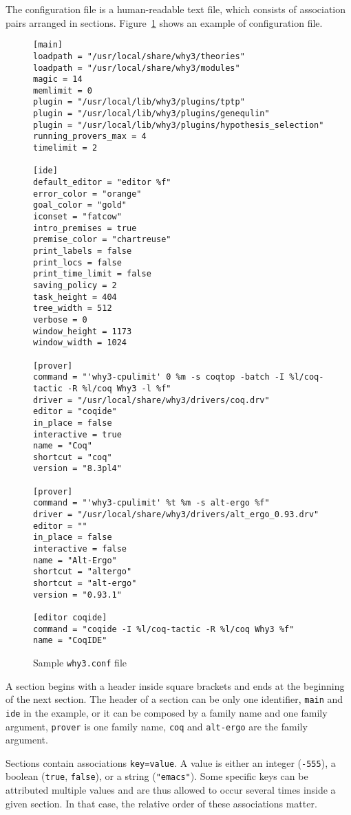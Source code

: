 The configuration file is a human-readable text file, which consists
of association pairs arranged in sections.
Figure~\ref{fig:why3conf} shows an example of configuration file.

\begin{figure}[p]
{\footnotesize
\begin{verbatim}
[main]
loadpath = "/usr/local/share/why3/theories"
loadpath = "/usr/local/share/why3/modules"
magic = 14
memlimit = 0
plugin = "/usr/local/lib/why3/plugins/tptp"
plugin = "/usr/local/lib/why3/plugins/genequlin"
plugin = "/usr/local/lib/why3/plugins/hypothesis_selection"
running_provers_max = 4
timelimit = 2

[ide]
default_editor = "editor %f"
error_color = "orange"
goal_color = "gold"
iconset = "fatcow"
intro_premises = true
premise_color = "chartreuse"
print_labels = false
print_locs = false
print_time_limit = false
saving_policy = 2
task_height = 404
tree_width = 512
verbose = 0
window_height = 1173
window_width = 1024

[prover]
command = "'why3-cpulimit' 0 %m -s coqtop -batch -I %l/coq-tactic -R %l/coq Why3 -l %f"
driver = "/usr/local/share/why3/drivers/coq.drv"
editor = "coqide"
in_place = false
interactive = true
name = "Coq"
shortcut = "coq"
version = "8.3pl4"

[prover]
command = "'why3-cpulimit' %t %m -s alt-ergo %f"
driver = "/usr/local/share/why3/drivers/alt_ergo_0.93.drv"
editor = ""
in_place = false
interactive = false
name = "Alt-Ergo"
shortcut = "altergo"
shortcut = "alt-ergo"
version = "0.93.1"

[editor coqide]
command = "coqide -I %l/coq-tactic -R %l/coq Why3 %f"
name = "CoqIDE"
\end{verbatim}
}
\caption{Sample \texttt{why3.conf} file}
\label{fig:why3conf}
\end{figure}

A section begins with a header inside square brackets and ends at the
beginning of the next section. The header of a
section can be only one identifier, \texttt{main} and \texttt{ide} in
the example, or it can be composed by a family name and one family
argument, \texttt{prover} is one family name, \texttt{coq} and
\texttt{alt-ergo} are the family argument.

Sections contain associations \texttt{key=value}. A value is either
an integer (\eg \texttt{-555}), a boolean (\texttt{true}, \texttt{false}),
or a string (\eg \texttt{"emacs"}). Some specific keys can be attributed
multiple values and are
thus allowed to occur several times inside a given section. In that
case, the relative order of these associations matter.

